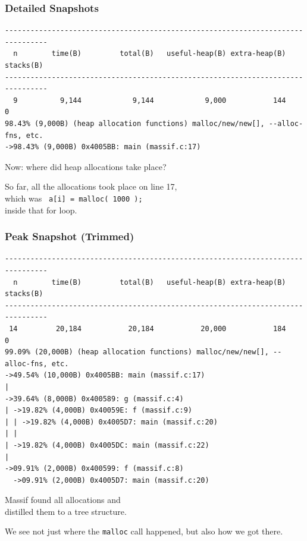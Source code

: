 \begin{frame}[fragile]
\frametitle{Detailed Snapshots}

{\scriptsize
\begin{verbatim}
--------------------------------------------------------------------------------
  n        time(B)         total(B)   useful-heap(B) extra-heap(B)    stacks(B)
--------------------------------------------------------------------------------
  9          9,144            9,144            9,000           144            0
98.43% (9,000B) (heap allocation functions) malloc/new/new[], --alloc-fns, etc.
->98.43% (9,000B) 0x4005BB: main (massif.c:17)
\end{verbatim}
}

\large
\begin{changemargin}{2cm}
Now: where did heap allocations take place?

So far, all the allocations took place on line 17,\\
 which was \texttt{  a[i] = malloc( 1000 ); } \\
inside that for loop.
\end{changemargin}

\end{frame}


\begin{frame}[fragile]
\frametitle{Peak Snapshot (Trimmed)}


{\scriptsize
\begin{verbatim}
--------------------------------------------------------------------------------
  n        time(B)         total(B)   useful-heap(B) extra-heap(B)    stacks(B)
--------------------------------------------------------------------------------
 14         20,184           20,184           20,000           184            0
99.09% (20,000B) (heap allocation functions) malloc/new/new[], --alloc-fns, etc.
->49.54% (10,000B) 0x4005BB: main (massif.c:17)
| 
->39.64% (8,000B) 0x400589: g (massif.c:4)
| ->19.82% (4,000B) 0x40059E: f (massif.c:9)
| | ->19.82% (4,000B) 0x4005D7: main (massif.c:20)
| |   
| ->19.82% (4,000B) 0x4005DC: main (massif.c:22)
|   
->09.91% (2,000B) 0x400599: f (massif.c:8)
  ->09.91% (2,000B) 0x4005D7: main (massif.c:20)

\end{verbatim}
}

\large
\begin{changemargin}{2cm}
Massif found  all  allocations  and \\ distilled them to a tree structure.

We see not just where the \texttt{malloc} call happened, but also how we got there.
\end{changemargin}

\end{frame}


